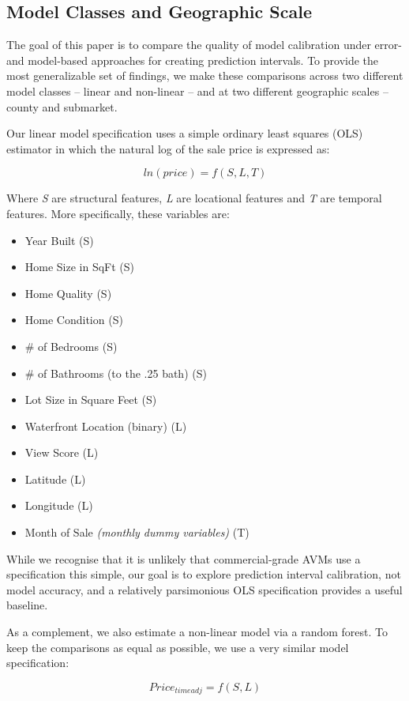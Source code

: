 \documentclass[colTwo]{format}
\theoremstyle{definition}
\begin{document}
\subsection{Model Classes and Geographic Scale}

The goal of this paper is to compare the quality of model calibration under error- and model-based approaches for creating prediction intervals.  To provide the most generalizable set of findings, we make these comparisons across two different model classes -- linear and non-linear -- and at two different geographic scales -- county and submarket.  

Our linear model specification uses a simple ordinary least squares (OLS) estimator in which the natural log of the sale price is expressed as:

\[ln(price) = f(S, L, T)\]

Where \textit{S} are structural features, \textit{L} are locational features and \textit{T} are temporal features.  More specifically, these variables are:

\begin{itemize}
\item Year Built (S)
\item Home Size in SqFt (S)
\item Home Quality (S)
\item Home Condition (S)
\item \# of Bedrooms (S)
\item \# of Bathrooms (to the .25 bath) (S)
\item Lot Size in Square Feet (S)
\item Waterfront Location (binary) (L)
\item View Score (L)
\item Latitude (L)
\item Longitude (L)
\item Month of Sale \textit{(monthly dummy variables)} (T) 
\end{itemize}

While we recognise that it is unlikely that commercial-grade AVMs use a specification this simple, our goal is to explore prediction interval calibration, not model accuracy, and a relatively parsimonious OLS specification provides a useful baseline.  

As a complement, we also estimate a non-linear model via a random forest.  To keep the comparisons as equal as possible, we use a very similar model specification:

\[Price_{timeadj} = f(S, L) \]
\end{document}
